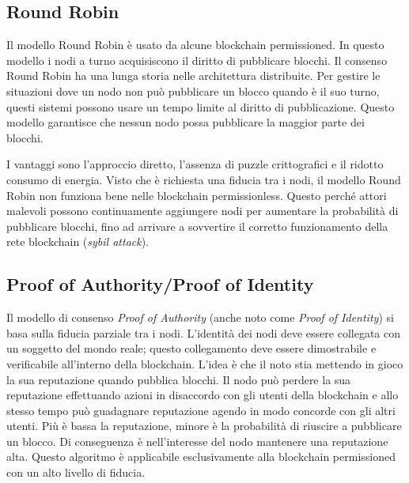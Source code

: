 \subsection{Round Robin}
Il modello Round Robin è usato da alcune blockchain permissioned.
In questo modello i nodi a turno acquisiscono il diritto di pubblicare blocchi. Il consenso
Round Robin ha una lunga storia nelle architettura distribuite. Per gestire le situazioni
dove un nodo non può pubblicare un blocco quando è il suo turno, questi sistemi possono
usare un tempo limite al diritto di pubblicazione. Questo modello garantisce che nessun nodo possa
pubblicare la maggior parte dei blocchi.

I vantaggi sono l'approccio diretto, l'assenza di puzzle crittografici e il ridotto consumo di energia.
Visto che è richiesta una fiducia tra i nodi, il modello Round Robin non funziona bene
nelle blockchain permissionless. Questo perché attori malevoli possono continuamente aggiungere
nodi per aumentare la probabilità di pubblicare blocchi, fino ad arrivare a
sovvertire il corretto funzionamento della rete blockchain (\textit{sybil attack}).

\subsection{Proof of Authority/Proof of Identity}
Il modello di consenso \textit{Proof of Authority} (anche noto come \textit{Proof of Identity})
si basa sulla fiducia parziale tra i nodi.
L'identità dei nodi deve essere collegata con un soggetto del mondo reale; questo collegamento deve essere
dimostrabile e verificabile all'interno della blockchain.
L'idea è che il noto stia mettendo in gioco la sua reputazione quando pubblica blocchi.
Il nodo può perdere la sua reputazione effettuando azioni in disaccordo con gli utenti della blockchain
e allo stesso tempo può guadagnare reputazione agendo in modo concorde con gli altri utenti.
Più è bassa la reputazione, minore è la probabilità di riuscire a pubblicare un blocco.
Di conseguenza è nell'interesse del nodo mantenere una reputazione alta. Questo algoritmo
è applicabile esclusivamente alla blockchain permissioned con un alto livello di fiducia.

